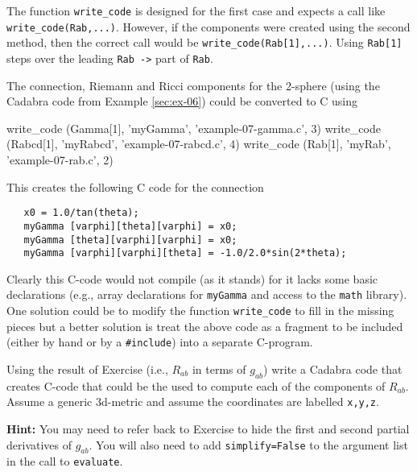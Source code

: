 \documentclass[a4paper,12pt]{article}
\numberwithin{equation}{section}%
\begin{document}
The function \verb|write_code| is designed for the first case and expects a call like
\verb|write_code(Rab,...)|. However, if the components were created using the second method,
then the correct call would be \verb|write_code(Rab[1],...)|. Using \verb|Rab[1]| steps over
the leading \verb|Rab ->| part of \verb|Rab|.

The connection, Riemann and Ricci components for the 2-sphere (using the Cadabra code from
Example \ref{sec:ex-06}) could be converted to C using
\begin{cadabra}[numbers=none]
   write_code (Gamma[1], 'myGamma', 'example-07-gamma.c', 3)
   write_code (Rabcd[1], 'myRabcd', 'example-07-rabcd.c', 4)
   write_code (Rab[1],   'myRab',   'example-07-rab.c',   2)
\end{cadabra}
This creates the following C code for the connection
\bgroup
\lstset{numbers=none,style=myC}
\begin{lstlisting}
   x0 = 1.0/tan(theta);
   myGamma [varphi][theta][varphi] = x0;
   myGamma [theta][varphi][varphi] = x0;
   myGamma [varphi][varphi][theta] = -1.0/2.0*sin(2*theta);
\end{lstlisting}
\egroup
Clearly this C-code would not compile (as it stands) for it lacks some basic declarations
(e.g., array declarations for \verb|myGamma| and access to the \verb|math| library). One
solution could be to modify the function \verb|write_code| to fill in the missing pieces but
a better solution is treat the above code as a fragment to be included (either by hand or by
a \verb|#include|) into a separate C-program.


\begin{Exercises}

   \begin{Exercise}
      Using the result of Exercise  (i.e., $R_{ab}$ in terms of $g_{ab}$)
      write a Cadabra code that creates C-code that could be the used to compute each of the
      components of $R_{ab}$. Assume a generic 3d-metric and assume the coordinates are
      labelled \verb|x,y,z|.

      {\bf Hint:} You may need to refer back to Exercise  to hide the first
                  and second partial derivatives of $g_{ab}$. You will also need to add
                  \verb|simplify=False| to the argument list in the call to
                  \verb|evaluate|.
   \end{Exercise}

\end{Exercises}
\end{document}
